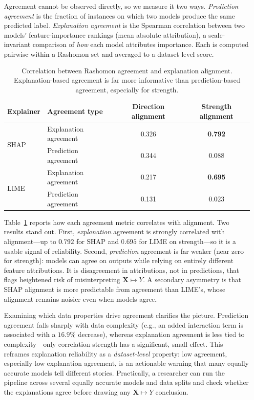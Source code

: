 \documentclass[12pt,letterpaper]{article}
\newcommand{\Xto}{\mathbf{X}\mapsto Y}
\begin{document}
Agreement cannot be observed directly, so we measure it two ways.
\emph{Prediction agreement} is the fraction of instances on which two models produce
the same predicted label. \emph{Explanation agreement} is the Spearman correlation
between two models' feature-importance rankings (mean absolute attribution), a
scale-invariant comparison of \emph{how} each model attributes importance. Each is
computed pairwise within a Rashomon set and averaged to a dataset-level score.

\begin{table}[t]
\centering\small
\caption{Correlation between Rashomon agreement and explanation alignment.
Explanation-based agreement is far more informative than prediction-based
agreement, especially for strength.}
\label{tab:agreement}
\begin{tabular}{llcc}
\toprule
\textbf{Explainer} & \textbf{Agreement type} & \textbf{Direction alignment} & \textbf{Strength alignment}\\
\midrule
\multirow{2}{*}{SHAP}
  & Explanation agreement & 0.326 & \textbf{0.792}\\
  & Prediction agreement  & 0.344 & 0.088\\
\midrule
\multirow{2}{*}{LIME}
  & Explanation agreement & 0.217 & \textbf{0.695}\\
  & Prediction agreement  & 0.131 & 0.023\\
\bottomrule
\end{tabular}
\end{table}

Table~\ref{tab:agreement} reports how each agreement metric correlates with
alignment. Two results stand out. First, \emph{explanation} agreement is strongly
correlated with alignment---up to $0.792$ for SHAP and $0.695$ for LIME on
strength---so it is a usable signal of reliability. Second, \emph{prediction}
agreement is far weaker (near zero for strength): models can agree on outputs while
relying on entirely different feature attributions. It is disagreement in
attributions, not in predictions, that flags heightened risk of misinterpreting
$\Xto$. A secondary asymmetry is that SHAP alignment is more predictable from
agreement than LIME's, whose alignment remains noisier even when models agree.

Examining which data properties drive agreement clarifies the picture. Prediction
agreement falls sharply with data complexity (e.g., an added interaction term is
associated with a $16.9\%$ decrease), whereas explanation agreement is less tied to
complexity---only correlation strength has a significant, small effect. This reframes
explanation reliability as a \emph{dataset-level} property: low agreement, especially
low explanation agreement, is an actionable warning that many equally accurate models
tell different stories. Practically, a researcher can run the pipeline across several
equally accurate models and data splits and check whether the explanations agree
before drawing any $\Xto$ conclusion.
\end{document}
